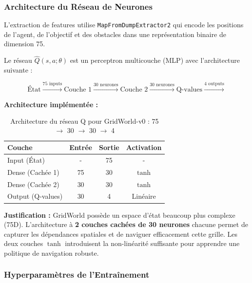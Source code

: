 \subsubsection{Architecture du Réseau de Neurones}

L'extraction de features utilise \texttt{MapFromDumpExtractor2} qui encode les positions de l'agent, de l'objectif et des obstacles dans une représentation binaire de dimension 75.

Le réseau $\hat{Q}(s,a;\theta)$ est un perceptron multicouche (MLP) avec l'architecture suivante :

\[
\text{État} \xrightarrow{75 \text{ inputs}} \text{Couche } 1 \xrightarrow{30 \text{ neurones}} \text{Couche } 2 \xrightarrow{30 \text{ neurones}} \text{Q-values} \xrightarrow{4 \text{ outputs}}
\]

\textbf{Architecture implémentée :}

\begin{table}[h!]
    \centering
    \begin{tabular}{|l|c|c|c|}
    \hline
    \textbf{Couche} & \textbf{Entrée} & \textbf{Sortie} & \textbf{Activation} \\
    \hline
    Input (État) & - & 75 & - \\
    \hline
    Dense (Cachée 1) & 75 & 30 & $\tanh$ \\
    \hline
    Dense (Cachée 2) & 30 & 30 & $\tanh$ \\
    \hline
    Output (Q-values) & 30 & 4 & Linéaire \\
    \hline
    \end{tabular}
    \caption{Architecture du réseau Q pour GridWorld-v0 : 75 $\to$ 30 $\to$ 30 $\to$ 4}
\end{table}

\textbf{Justification :} GridWorld possède un espace d'état beaucoup plus complexe (75D). L'architecture à \textbf{2 couches cachées de 30 neurones} chacune permet de capturer les dépendances spatiales et de naviguer efficacement cette grille. Les deux couches $\tanh$ introduisent la non-linéarité suffisante pour apprendre une politique de navigation robuste.

\subsubsection{Hyperparamètres de l'Entraînement}


